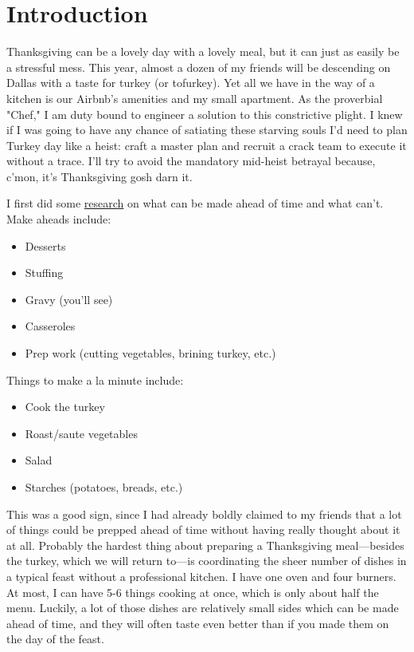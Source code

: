 \documentclass[12pt]{article}
\begin{document}
	\newpage
	
	\tableofcontents
	
	\newpage
	
	
	\section{Introduction}\label{sec:introduction}
	Thanksgiving can be a lovely day with a lovely meal, but it can just as easily be a stressful mess. This year, almost a dozen of my friends will be descending on Dallas with a taste for turkey (or tofurkey). Yet all we have in the way of a kitchen is our Airbnb's amenities and my small apartment. As the proverbial "Chef," I am duty bound to engineer a solution to this constrictive plight. I knew if I was going to have any chance of satiating these starving souls I'd need to plan Turkey day like a heist: craft a master plan and recruit a crack team to execute it without a trace. I'll try to avoid the mandatory mid-heist betrayal because, c'mon, it's Thanksgiving gosh darn it.
	
	I first did some \href{https://www.foodandwine.com/how/thanksgiving-dishes-make-ahead-advance-sides}{research} on what can be made ahead of time and what can't. Make aheads include:
	\begin{itemize}
		\item Desserts
		\item Stuffing
		\item Gravy (you'll see)
		\item Casseroles
		\item Prep work (cutting vegetables, brining turkey, etc.)
	\end{itemize}
	
	Things to make a la minute include:
	\begin{itemize}
		\item Cook the turkey
		\item Roast/saute vegetables
		\item Salad
		\item Starches (potatoes, breads, etc.)
	\end{itemize}
	
	This was a good sign, since I had already boldly claimed to my friends that a lot of things could be prepped ahead of time without having really thought about it at all. Probably the hardest thing about preparing a Thanksgiving meal—besides the turkey, which we will return to—is coordinating the sheer number of dishes in a typical feast without a professional kitchen. I have one oven and four burners. At most, I can have 5-6 things cooking at once, which is only about half the menu. Luckily, a lot of those dishes are relatively small sides which can be made ahead of time, and they will often taste even better than if you made them on the day of the feast.
	
\end{document}
